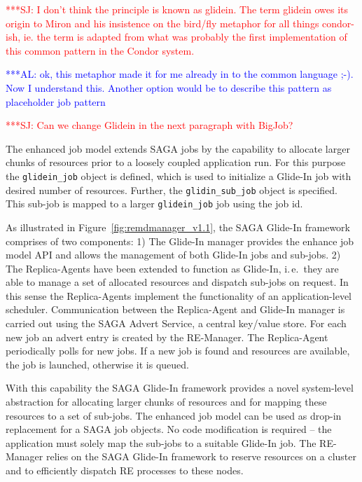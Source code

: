 \documentclass{rspublic}
\newcommand{\alnote}[1]{ {\textcolor{blue} { ***AL: #1 }}}
\newcommand{\jhanote}[1]{ {\textcolor{red} { ***SJ: #1 }}}
\newcommand{\alnote}[1]{}
\newcommand{\jhanote}[1]{}
\newcommand{\replicaagent}[1]{Replica-Agent }
\begin{document}

\jhanote{I don't think the principle is known as glidein. The term
  glidein owes its origin to Miron and his insistence on the bird/fly
  metaphor for all things condor-ish, ie. the term is adapted from
  what was probably the first implementation of this common pattern in
  the Condor system.}

\alnote{ok, this metaphor made it for me already in to the common
  language ;-). Now I understand this. Another option would be to
  describe this pattern as placeholder job pattern}

\jhanote{Can we change Glidein in the next paragraph with BigJob?}

The enhanced job model extends SAGA jobs by the capability to allocate
larger chunks of resources prior to a loosely coupled application
run. For this purpose the \texttt{glidein\_job} object is defined,
which is used to initialize a Glide-In job with desired number of
resources.  Further, the \texttt{glidin\_sub\_job} object is
specified. This sub-job is mapped to a larger \texttt{glidein\_job}
job using the job id.
                      

As illustrated in Figure~\ref{fig:remdmanager_v1.1}, the SAGA Glide-In
framework comprises of two components: 1) The Glide-In manager
provides the enhance job model API and allows the management of both
Glide-In jobs and sub-jobs.  2) The Replica-Agents have been extended
to function as Glide-In, i.\,e.\ they are able to manage a set of
allocated resources and dispatch sub-jobs on request. In this sense
the Replica-Agents implement the functionality of an application-level
scheduler. Communication between the Replica-Agent and Glide-In
manager is carried out using the SAGA Advert Service, a central
key/value store. For each new job an advert entry is created by the
RE-Manager. The \replicaagent\ periodically polls for new jobs.  If a
new job is found and resources are available, the job is launched,
otherwise it is queued.

With this capability the SAGA Glide-In framework provides a novel
system-level abstraction for allocating larger chunks of resources and
for mapping these resources to a set of sub-jobs. The enhanced job
model can be used as drop-in replacement for a SAGA job objects. No
code modification is required -- the application must solely map the
sub-jobs to a suitable Glide-In job.  The RE-Manager relies on the
SAGA Glide-In framework to reserve resources on a cluster and to
efficiently dispatch RE processes to these nodes.
                                         
\end{document}
